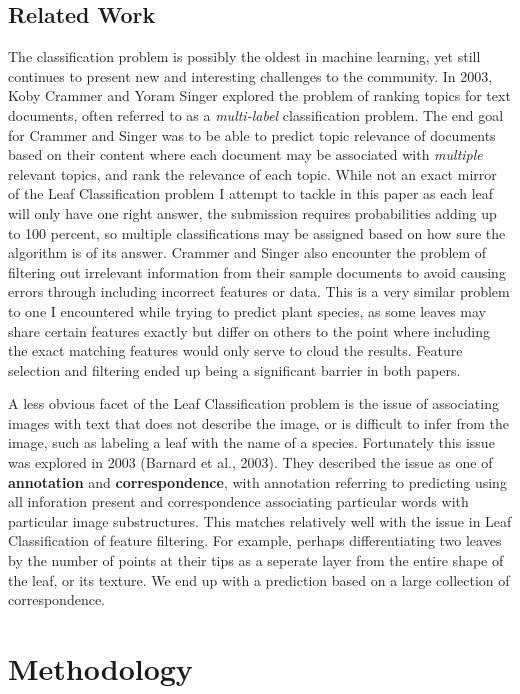 \documentclass[12pt]{article}
\begin{document}
\subsection{Related Work}

The classification problem is possibly the oldest in machine learning, yet still continues to present new and interesting challenges to the community. In 2003, Koby Crammer and Yoram Singer explored the problem of ranking topics for text documents, often referred to as a \textit{multi-label} classification problem. The end goal for Crammer and Singer was to be able to predict topic relevance of documents based on their content where each document may be associated with \textit{multiple} relevant topics, and rank the relevance of each topic. While not an exact mirror of the Leaf Classification problem I attempt to tackle in this paper as each leaf will only have one right answer, the submission requires probabilities adding up to 100 percent, so multiple classifications may be assigned based on how sure the algorithm is of its answer. Crammer and Singer also encounter the problem of filtering out irrelevant information from their sample documents to avoid causing errors through including incorrect features or data. This is a very similar problem to one I encountered while trying to predict plant species, as some leaves may share certain features exactly but differ on others to the point where including the exact matching features would only serve to cloud the results. Feature selection and filtering ended up being a significant barrier in both papers.

A less obvious facet of the Leaf Classification problem is the issue of associating images with text that does not describe the image, or is difficult to infer from the image, such as labeling a leaf with the name of a species. Fortunately this issue was explored in 2003 (Barnard et al., 2003). They described the issue as one of \textbf{annotation} and \textbf{correspondence}, with annotation referring to predicting using all inforation present and correspondence associating particular words with particular image substructures. This matches relatively well with the issue in Leaf Classification of feature filtering. For example, perhaps differentiating two leaves by the number of points at their tips as a seperate layer from the entire shape of the leaf, or its texture. We end up with a prediction based on a large collection of correspondence.

\section{Methodology}
\end{document}
